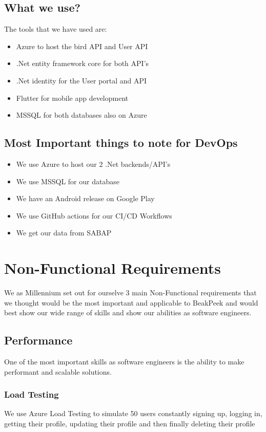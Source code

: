 \documentclass[a4paper]{article}
\begin{document}
\subsection{What we use?}
The tools that we have used are:
\begin{itemize}
    \item Azure to host the bird API and User API
    \item .Net entity framework core for both API's
    \item .Net identity for the User portal and API
    \item Flutter for mobile app development
    \item MSSQL for both databases also on Azure
\end{itemize}

\subsection{Most Important things to note for DevOps}

\begin{itemize}
    \item We use Azure to host our 2 .Net backends/API's
    \item We use MSSQL for our database
    \item We have an Android release on Google Play
    \item We use GitHub actions for our CI/CD Workflows
    \item We get our data from SABAP
\end{itemize}

\section{Non-Functional Requirements}

We as Millennium set out for ourselve 3 main Non-Functional requirements that we
thought would be the most important and applicable to BeakPeek and would best show 
our wide range of skills and show our abilities as software engineers.

\subsection{Performance}
One of the most important skills as software engineers is the ability to make performant
and scalable solutions. \newline

\subsubsection{Load Testing}
We use Azure Load Testing to simulate 50 users constantly signing up, logging in, 
getting their profile, updating their profile and then finally deleting their profile
\end{document}
